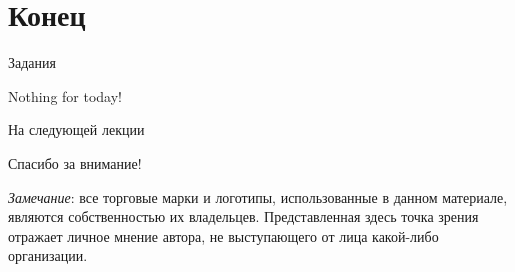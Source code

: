 \section{Конец}

\begin{frame}{Задания}

Nothing for today!

\end{frame}

\begin{frame}{На следующей лекции}
\end{frame}

\begin{frame}

{\huge{Спасибо за внимание!}\par}

\vfill

\tiny{\textit{Замечание}: все торговые марки и логотипы, использованные в данном материале, являются собственностью их владельцев. Представленная здесь точка зрения отражает личное мнение автора, не выступающего от лица какой-либо организации.}

\end{frame}



